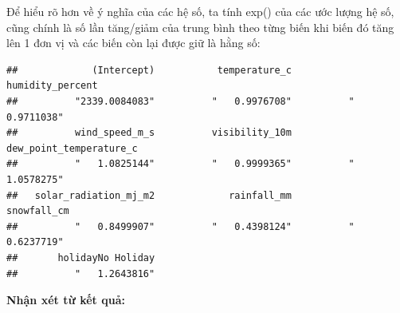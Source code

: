 \documentclass[
  11pt,
  letterpaper,
]{article}
\begin{document}
Để hiểu rõ hơn về ý nghĩa của các hệ số, ta tính exp() của các ước lượng hệ số, cũng chính là số lần tăng/giảm của trung bình theo từng biến khi biến đó tăng lên 1 đơn vị và các biến còn lại được giữ là hằng số:

\begin{verbatim}
##             (Intercept)           temperature_c        humidity_percent 
##          "2339.0084083"          "   0.9976708"          "   0.9711038" 
##          wind_speed_m_s          visibility_10m dew_point_temperature_c 
##          "   1.0825144"          "   0.9999365"          "   1.0578275" 
##   solar_radiation_mj_m2             rainfall_mm             snowfall_cm 
##          "   0.8499907"          "   0.4398124"          "   0.6237719" 
##       holidayNo Holiday 
##          "   1.2643816"
\end{verbatim}

\textbf{Nhận xét từ kết quả:}
\end{document}
